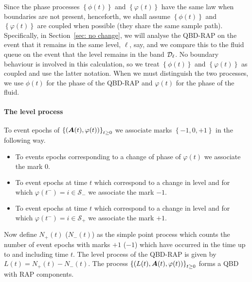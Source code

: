 Since the phase processes \(\left\{{\phi}(t)\right\}\) and \(\left\{\varphi(t)\right\}\) have the same law when boundaries are not present, henceforth, we shall assume \(\left\{{\phi}(t)\right\}\) and \(\left\{\varphi(t)\right\}\) are coupled when possible (they share the same sample path). Specifically, in Section~\ref{sec: no change}, we will analyse the QBD-RAP on the event that it remains in the same level, \(\ell\), say, and we compare this to the fluid queue on the event that the level remains in the band \(\mathcal{D}_\ell\). No boundary behaviour is involved in this calculation, so we treat \(\left\{{\phi}(t)\right\}\) and \(\left\{\varphi(t)\right\}\) as coupled and use the latter notation. When we must distinguish the two processes, we use \(\phi(t)\) for the phase of the QBD-RAP and \(\varphi(t)\) for the phase of the fluid. 


\paragraph{The level process}
To event epochs of \(\left\{(\boldsymbol A(t),{\varphi}(t))\right\}_{t\geq0}\) we associate marks \(\left\{-1,0,+1\right\}\) in the following way.
\begin{itemize}
	\item To events epochs corresponding to a change of phase of \( {\varphi}(t)\) we associate the mark \(0\).
	\item To event epochs at time \(t\) which correspond to a change in level and for which \( {\varphi}(t^-)=i\in\mathcal S_-\) we associate the mark \(-1\).
	\item To event epochs at time \(t\) which correspond to a change in level and for which \( {\varphi}(t^-)=i\in\mathcal S_+\) we associate the mark \(+1\).
\end{itemize}
Now define \(N_+(t)\) (\(N_-(t)\)) as the simple point process which counts the number of event epochs with marks \(+1\) (\(-1\)) which have occurred in the time up to and including time \(t\). The level process of the QBD-RAP is given by \( L(t) = N_+(t)-N_-(t)\). The process \(\left\{(L(t),\boldsymbol A(t),\varphi(t))\right\}_{t\geq 0}\) forms a QBD with RAP components.

